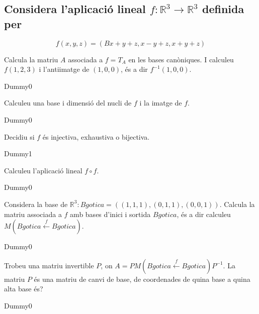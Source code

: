 \documentclass[a4paper, 12pt]{article}
\begin{document}
    \subsection{Considera l'aplicació lineal $f: \mathbb{R}^3 \rightarrow \mathbb{R}^3$ definida per}
    \begin{displaymath}
        f(x,y,z) = (Bx+y+z, x-y+z, x+y+z)
    \end{displaymath}
    \begin{exercici}
        Calcula la matriu $A$ associada a $f = T_A$ en les bases canòniques. I calculeu $f(1,2,3)$ i l'antiimatge de $(1,0,0)$, és a dir $f^{-1}(1,0,0)$.
    \end{exercici}
    \begin{solucio}
        Dummy0
    \end{solucio}
    \begin{exercici}
        Calculeu una base i dimensió del nucli de $f$ i la imatge de $f$.
    \end{exercici}
    \begin{solucio}
        Dummy0
    \end{solucio}
    \begin{exercici}
        Decidiu si $f$ és injectiva, exhaustiva o bijectiva.
    \end{exercici}
    \begin{solucio}
        Dummy1
    \end{solucio}
    \begin{exercici}
        Calculeu l'aplicació lineal $f \circ f$.
    \end{exercici}
    \begin{solucio}
        Dummy0
    \end{solucio}
    \begin{exercici}
        Considera la base de $\mathbb{R}^3: Bgotica = ((1,1,1), (0,1,1), (0,0,1))$. Calcula la
        matriu associada a $f$ amb bases d'inici i sortida $Bgotica$, és a dir calculeu $M(Bgotica \xleftarrow{f} Bgotica)$.
    \end{exercici}
    \begin{solucio}
        Dummy0
    \end{solucio}
    \begin{exercici}
        Trobeu una matriu invertible $P$, on $A = PM(Bgotica \xleftarrow{f} Bgotica)P^{-1}$. La
        matriu $P$ és una matriu de canvi de base, de coordenades de quina base a quina alta base és?
    \end{exercici}
    \begin{solucio}
        Dummy0
    \end{solucio}
    
\end{document}
